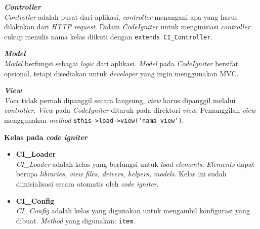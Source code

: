 \documentclass[a4paper,twoside]{article}
\begin{document}
\begin{enumerate}
\begin{enumerate}
		 \textbf{\textit{Controller}} \\
		 \textit{Controller} adalah pusat dari aplikasi, \textit{controller} menangani apa yang harus dilakukan dari \textit{HTTP request}. Dalam \textit{CodeIgniter} untuk menginisiasi \textit{controller} cukup menulis nama kelas diikuti dengan \texttt{extends CI\_Controller}.
		 
		 \textbf{\textit{Model}} \\ \textit{Model} berfungsi sebagai \textit{logic} dari aplikasi. \textit{Model} pada \textit{CodeIgniter} bersifat opsional, tetapi disediakan untuk \textit{developer} yang ingin menggunakan MVC. 
		 
		\textbf{\textit{View}} \\
		\textit{View} tidak pernah dipanggil secara langsung, \textit{view} harus dipanggil melalui \textit{controller}. \textit{View} pada \textit{CodeIgniter} ditaruh pada direktori \textit{view}. Pemanggilan \textit{view} menggunakan \textit{method} \texttt{\$this->load->view(`nama\_view')}.
		
		\textbf{Kelas pada \textit{code igniter}} 
		\begin{itemize}
			\item \textbf{CI\_Loader} \\ 
			\textit{CI\_Loader} adalah kelas yang berfungsi untuk \textit{load elements}. \textit{Elements} dapat berupa \textit{libraries, view files, drivers, helpers, models}. Kelas ini sudah diinisialisasi secara otomatis oleh \textit{code igniter}.
			
			\item \textbf{CI\_Config} \\
			\textit{CI\_Config} adalah kelas yang digunakan untuk mengambil konfigurasi yang dibuat. \textit{Method} yang digunakan: \texttt{item}.
			

\end{itemize}
\end{enumerate}
\end{enumerate}
\end{document}

